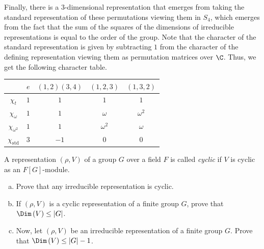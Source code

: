 \documentclass[10pt]{mypackage}
\begin{document}
\begin{solution}
  Finally, there is a $3$-dimensional representation that emerges from taking the standard representation of these permutations viewing them in $S_4$, which emerges from the fact that the sum of the squares of the dimensions of irreducible representations is equal to the order of the group. Note that the character of the standard representation is given by subtracting $1$ from the character of the defining representation viewing them as permutation matrices over $\C$. Thus, we get the following character table.
  \begin{center}
    \begin{tabular}{c|c|c|c|c}
      & $e$ & $\left( 1,2 \right)\left( 3,4 \right)$ & $\left( 1,2,3 \right)$ & $\left( 1,3,2 \right)$\\
      \hline
      $\chi_{t}$ & $1$ & $1$ & $1$ & $1$\\
      $\chi_{\omega}$ & $1$ & $1$ & $\omega$ & $\omega^2$\\
      $\chi_{\omega^2}$ & $1$ & $1$ & $\omega^2$ & $\omega$\\
      $\chi_{\operatorname{std}}$ & $3$ & $-1$ & $0$ & $0$\\
      \hline
    \end{tabular}
  \end{center}
\end{solution}
\begin{problem}[Problem 5]
  A representation $\left( \rho,V \right)$ of a group $G$ over a field $F$ is called \textit{cyclic} if $V$ is cyclic as an $F[G]$-module.
  \begin{enumerate}[(a)]
    \item Prove that any irreducible representation is cyclic.
    \item If $\left( \rho,V \right)$ is a cyclic representation of a finite group $G$, prove that $\Dim\left( V \right)\leq \left\vert G \right\vert$.
    \item Now, let $\left( \rho,V \right)$ be an irreducible representation of a finite group $G$. Prove that $\Dim\left( V \right)\leq \left\vert G \right\vert-1$.
  \end{enumerate}
\end{problem}
\end{document}
